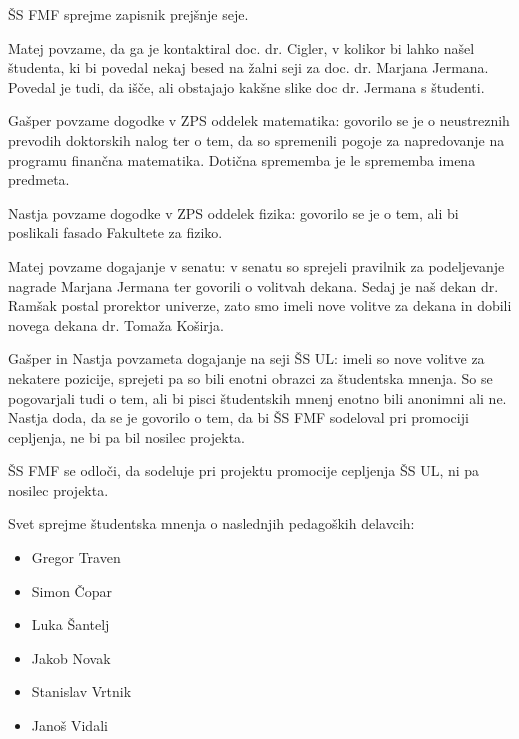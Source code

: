 \documentclass{seja}
\begin{document}
\begin{ad}
    \item
    \begin{sklep*}
        ŠS FMF sprejme zapisnik prejšnje seje.
    \end{sklep*}

\item 
Matej povzame, da ga je kontaktiral doc. dr. Cigler, v kolikor bi lahko našel študenta, ki bi povedal nekaj besed na žalni seji za doc. dr. Marjana Jermana. Povedal je tudi, da išče, ali obstajajo kakšne slike doc dr. Jermana s študenti.
\item 
Gašper povzame dogodke v ZPS oddelek matematika: govorilo se je o neustreznih prevodih doktorskih nalog ter o tem, da so spremenili pogoje za napredovanje na programu finančna matematika. Dotična sprememba je le sprememba imena predmeta.

Nastja povzame dogodke v ZPS oddelek fizika: govorilo se je o tem, ali bi poslikali fasado Fakultete za fiziko.

Matej povzame dogajanje v senatu: v senatu so sprejeli pravilnik za podeljevanje nagrade Marjana Jermana ter govorili o volitvah dekana. Sedaj je naš dekan dr. Ramšak postal prorektor univerze, zato smo imeli nove volitve za dekana in dobili novega dekana dr. Tomaža Koširja.
    
Gašper in Nastja povzameta dogajanje na seji ŠS UL: imeli so nove volitve za nekatere pozicije, sprejeti pa so bili enotni obrazci za študentska mnenja. So se pogovarjali tudi o tem, ali bi pisci študentskih mnenj enotno bili anonimni ali ne. Nastja doda, da se je govorilo o tem, da bi ŠS FMF sodeloval pri promociji cepljenja, ne bi pa bil nosilec projekta.

   \begin{sklep*}
        ŠS FMF se odloči, da sodeluje pri projektu promocije cepljenja ŠS UL, ni pa nosilec projekta.
    \end{sklep*}

\item
\begin{sklep*}
        Svet sprejme študentska mnenja o naslednjih pedagoških delavcih:
        \begin{itemize}
            \item Gregor Traven
            \item Simon Čopar
            \item Luka Šantelj
            \item Jakob Novak
            \item Stanislav Vrtnik
            \item Janoš Vidali
            

\end{itemize}
\end{sklep*}
\end{ad}
\end{document}

